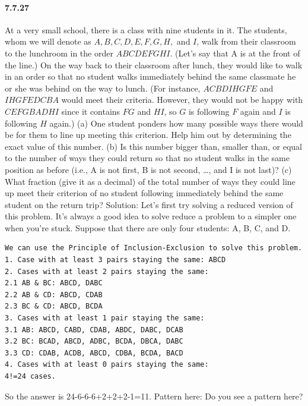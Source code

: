 \documentclass{article}
\begin{document}
\paragraph{7.7.27}
At a very small school, there is a class with nine students in it. The students, whom
we will denote as $A, B, C, D, E, F, G, H,$ and $I$, walk from their classroom to the
lunchroom in the order $ABCDEFGHI$. (Let’s say that A is at the front of the line.) On
the way back to their classroom after lunch, they would like to walk in an order so
that no student walks immediately behind the same classmate he or she was behind
on the way to lunch. (For instance, $ACBDIHGFE$ and $IHGFEDCBA$ would meet their
criteria. However, they would not be happy with $CEFGBADHI$ since it contains $FG$
and $HI$, so $G$ is following $F$ again and $I$ is following $H$ again.)\newline
(a) One student ponders how many possible ways there would be for them to line
up meeting this criterion. Help him out by determining the exact value of this
number.\newline
(b) Is this number bigger than, smaller than, or equal to the number of ways they
could return so that no student walks in the same position as before (i.e., A is not
first, B is not second, …, and I is not last)?\newline
(c) What fraction (give it as a decimal) of the total number of ways they could line up
meet their criterion of no student following immediately behind the same student
on the return trip?\newline
Solution:\newline
Let's first try solving a reduced version of this problem. It's always a good idea to solve reduce a problem to a simpler one when you're stuck. Suppose that there are only four students: A, B, C, and D.\newline
\begin{lstlisting}
We can use the Principle of Inclusion-Exclusion to solve this problem. 
1. Case with at least 3 pairs staying the same: ABCD
2. Cases with at least 2 pairs staying the same:
2.1 AB & BC: ABCD, DABC
2.2 AB & CD: ABCD, CDAB
2.3 BC & CD: ABCD, BCDA
3. Cases with at least 1 pair staying the same:
3.1 AB: ABCD, CABD, CDAB, ABDC, DABC, DCAB
3.2 BC: BCAD, ABCD, ADBC, BCDA, DBCA, DABC
3.3 CD: CDAB, ACDB, ABCD, CDBA, BCDA, BACD
4. Cases with at least 0 pairs staying the same:
4!=24 cases.
\end{lstlisting}
So the answer is 24-6-6-6+2+2+2-1=11. \newline
Pattern here:\newline
Do you see a pattern here?
\end{document}
